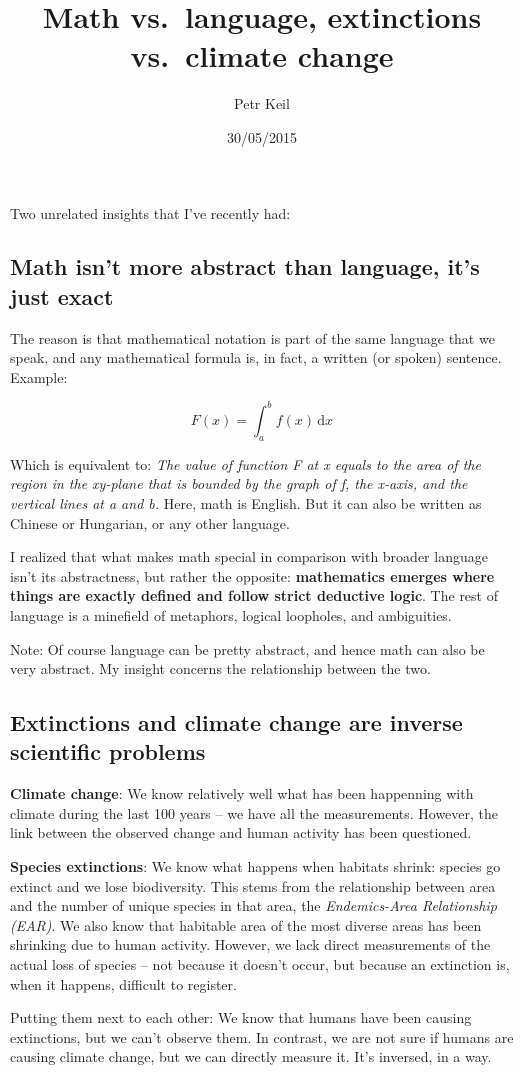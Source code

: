 \documentclass[]{article}
\title{Math vs.~language, extinctions vs.~climate change}
\author{Petr Keil}
\date{30/05/2015}
\begin{document}
\maketitle


Two unrelated insights that I've recently had:

\subsection{Math isn't more abstract than language, it's just
exact}\label{math-isnt-more-abstract-than-language-its-just-exact}

The reason is that mathematical notation is part of the same language
that we speak, and any mathematical formula is, in fact, a written (or
spoken) sentence. Example:

\[F(x)=\int_a^b \! f(x) \, \mathrm{d}x\]

Which is equivalent to: \emph{The value of function F at x equals to the
area of the region in the xy-plane that is bounded by the graph of f,
the x-axis, and the vertical lines at a and b.} Here, math is English.
But it can also be written as Chinese or Hungarian, or any other
language.

I realized that what makes math special in comparison with broader
language isn't its abstractness, but rather the opposite:
\textbf{mathematics emerges where things are exactly defined and follow
strict deductive logic}. The rest of language is a minefield of
metaphors, logical loopholes, and ambiguities.

Note: Of course language can be pretty abstract, and hence math can also
be very abstract. My insight concerns the relationship between the two.

\subsection{Extinctions and climate change are inverse scientific
problems}\label{extinctions-and-climate-change-are-inverse-scientific-problems}

\textbf{Climate change}: We know relatively well what has been
happenning with climate during the last 100 years -- we have all the
measurements. However, the link between the observed change and human
activity has been questioned.

\textbf{Species extinctions}: We know what happens when habitats shrink:
species go extinct and we lose biodiversity. This stems from the
relationship between area and the number of unique species in that area,
the \emph{Endemics-Area Relationship (EAR)}. We also know that habitable
area of the most diverse areas has been shrinking due to human activity.
However, we lack direct measurements of the actual loss of species --
not because it doesn't occur, but because an extinction is, when it
happens, difficult to register.

Putting them next to each other: We know that humans have been causing
extinctions, but we can't observe them. In contrast, we are not sure if
humans are causing climate change, but we can directly measure it. It's
inversed, in a way.
\end{document}
